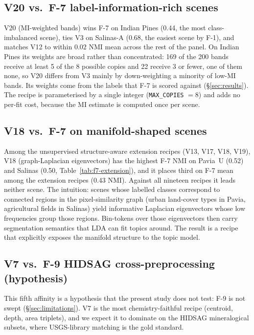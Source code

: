 \documentclass[journal,a4paper,10pt]{IEEEtran}
\begin{document}
\subsection{V20 vs.\ F-7 label-information-rich scenes}
\label{subsec:v20-affinity}
V20 (MI-weighted bands) wins F-7 on Indian Pines (0.44, the most
class-imbalanced scene), ties V3 on Salinas-A (0.68, the easiest scene
by F-1), and matches V12 to within $0.02$ NMI mean across the rest of
the panel. On Indian Pines its weights are broad rather than
concentrated: 169 of the 200 bands receive at least 5 of the 8
possible copies and 22 receive 3 or fewer, one of them none, so V20
differs from V3 mainly by down-weighting a minority of low-MI bands.
Its weights come from the labels that F-7 is scored against
(\S\ref{sec:results}). The recipe is parameterised by a single integer
(\texttt{MAX\_COPIES} $= 8$) and adds no per-fit cost, because the MI
estimate is computed once per scene.

\subsection{V18 vs.\ F-7 on manifold-shaped scenes}
\label{subsec:v18-affinity}
Among the unsupervised structure-aware extension recipes (V13, V17,
V18, V19), V18 (graph-Laplacian eigenvectors) has the highest F-7 NMI
on Pavia~U (0.52) and Salinas (0.50, Table~\ref{tab:f7-extension}), and
it places third on F-7 mean among the extension recipes (0.43 NMI).
Against all nineteen recipes it leads neither scene. The intuition: scenes whose labelled classes
correspond to connected regions in the pixel-similarity graph (urban
land-cover types in Pavia, agricultural fields in Salinas) yield
informative Laplacian eigenvectors whose low frequencies group those
regions. Bin-tokens over those eigenvectors then carry segmentation
semantics that LDA can fit topics around. The result is a recipe that
explicitly exposes the manifold structure to the topic model.

\subsection{V7 vs.\ F-9 HIDSAG cross-preprocessing
(hypothesis)}
\label{subsec:v7-hypothesis}
This fifth affinity is a hypothesis that the present study does not
test: F-9 is not swept (\S\ref{sec:limitations}). V7 is the most
chemistry-faithful recipe (centroid, depth, area triplets), and we
expect it to dominate on the HIDSAG mineralogical subsets, where
USGS-library matching is the gold standard.
\end{document}
